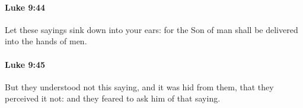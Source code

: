 		\paragraph{Luke 9:44} %
			\label{LUKE-9-44}

			Let these sayings sink down into your ears: for the Son of man shall be delivered into the hands of men.

			\begin{framed}
			\scriptsize
				\begin{compactdesc}
					\item[SBLG] 
				\end{compactdesc}
			\end{framed}

		\paragraph{Luke 9:45} %
			\label{LUKE-9-45}

			But they understood not this saying, and it was hid from them, that they perceived it not: and they feared to ask him of that saying.

